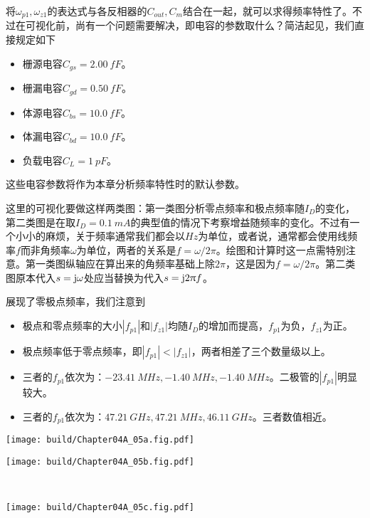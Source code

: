 将$\omega_{p1},\omega_{z1}$的表达式与各反相器的$C_{out},C_{m}$结合在一起，就可以求得频率特性了。不过在可视化前，尚有一个问题需要解决，即电容的参数取什么？简洁起见，我们直接规定如下
\begin{itemize}
    \item 栅源电容$C_{gs}=\SI{2.00}{fF}$。
    \item 栅漏电容$C_{gd}=\SI{0.50}{fF}$。
    \item 体源电容$C_{bs}=\SI{10.0}{fF}$。
    \item 体漏电容$C_{bd}=\SI{10.0}{fF}$。
    \item 负载电容$C_L=\SI{1}{pF}$。
\end{itemize}

这些电容参数将作为本章分析频率特性时的默认参数。\goodbreak

这里的可视化要做这样两类图：第一类图分析零点频率和极点频率随$I_D$的变化，第二类图是在取$I_D=\SI{0.1}{mA}$的典型值的情况下考察增益随频率的变化。不过有一个小小的麻烦，关于频率通常我们都会以$\si{Hz}$为单位，或者说，通常都会使用线频率$f$而非角频率$\omega$为单位，两者的关系是$f=\omega/2\pi$。绘图和计算时这一点需特别注意。第一类图纵轴应在算出来的角频率基础上除$2\pi$，这是因为$f=\omega/2\pi$。第二类图原本代入$s=\mathrm{j}\omega$处应当替换为代入$s=\mathrm{j} 2\uppi f$。


展现了零极点频率，我们注意到
\begin{itemize}
    \item 极点和零点频率的大小$|f_{p1}|$和$|f_{z1}|$均随$I_D$的增加而提高，$f_{p1}$为负，$f_{z1}$为正。
    \item 极点频率低于零点频率，即$|f_{p1}|<|f_{z1}|$，两者相差了三个数量级以上。
    \item 三者的$f_{p1}$依次为：$\SI{-23.41}{MHz},\SI{-1.40}{MHz},\SI{-1.40}{MHz}$。二极管的$|f_{p1}|$明显较大。
    \item 三者的$f_{p1}$依次为：$\SI{47.21}{GHz},\SI{47.21}{MHz},\SI{46.11}{GHz}$。三者数值相近。
\end{itemize}
\begin{Figure}[反相放大器的零级点频率]
    \begin{FigureSub}
        \texttt{[image: build/Chapter04A\_05a.fig.pdf]}
    \end{FigureSub}
    \begin{FigureSub}
        \texttt{[image: build/Chapter04A\_05b.fig.pdf]}
    \end{FigureSub}\\ \vspace{0.25cm}
    \begin{FigureSub}
        \texttt{[image: build/Chapter04A\_05c.fig.pdf]}
    \end{FigureSub}
\end{Figure}

